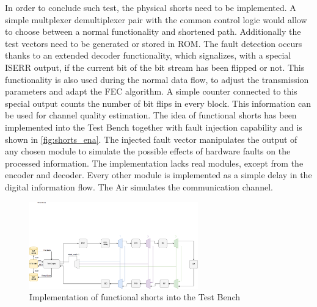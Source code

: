 In order to conclude such test, the physical shorts need to be implemented. A simple multplexer demultiplexer pair with the common control logic would allow to choose between a normal functionality and shortened path. Additionally the test vectors need to be generated or stored in ROM. The fault detection occurs thanks to an extended decoder functionality, which signalizes, with a special ISERR output, if the current bit of the bit stream has been flipped or not. This functionality is also used during the normal data flow, to adjust the transmission parameters and adapt the FEC algorithm. A simple counter connected to this special output counts the number of bit flips in every block. This information can be used for channel quality estimation. 
The idea of functional shorts has been implemented into the Test Bench together with fault injection capability and is shown in \autoref{fig:shorts_ena}. The injected fault vector manipulates the output of any chosen module to simulate the possible effects of hardware faults on the processed information. The implementation lacks real modules, except from the encoder and decoder. Every other module is implemented as a simple delay in the digital information flow. The Air simulates the communication channel. 

\begin{figure}[h]
\centering
\includegraphics[width=0.65\textwidth]{figures/Short_ena.png}
\caption{Implementation of functional shorts into the Test Bench}
\label{fig:short_ena}
\end{figure}

